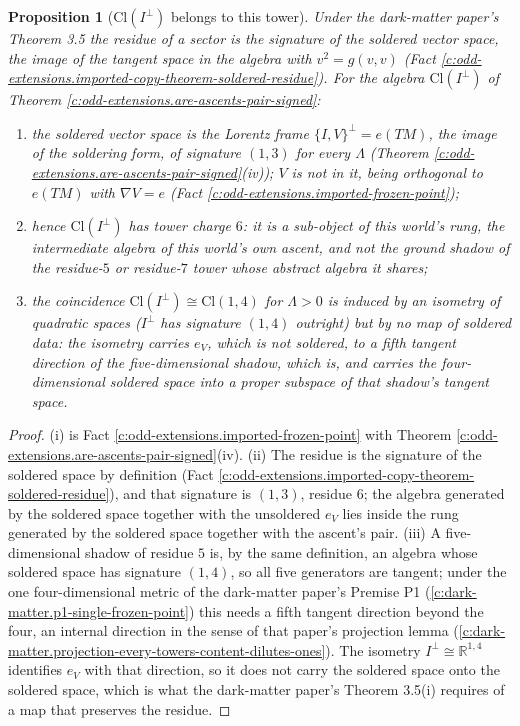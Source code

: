 \documentclass[11pt]{article}
\newtheorem{proposition}[theorem]{Proposition}
\theoremstyle{definition}
\theoremstyle{plain}
\providecommand{\Cl}{}\renewcommand{\Cl}{\mathrm{Cl}}
\providecommand{\R}{}\renewcommand{\R}{\mathbb{R}}
\begin{document}
\begin{proposition}[$\Cl(I^{\perp})$ belongs to this tower]\label{c:odd-extensions.belongs-tower}
Under the dark-matter paper's Theorem 3.5 the residue of a sector is the signature of the soldered vector space, the image of the tangent space in the algebra with $v^{2} = g(v,v)$ (Fact \ref{c:odd-extensions.imported-copy-theorem-soldered-residue}). For the algebra $\Cl(I^{\perp})$ of Theorem \ref{c:odd-extensions.are-ascents-pair-signed}:
\begin{enumerate}
\item[(i)] the soldered vector space is the Lorentz frame $\{I,V\}^{\perp} = e(TM)$, the image of the soldering form, of signature $(1,3)$ for every $\Lambda$ (Theorem \ref{c:odd-extensions.are-ascents-pair-signed}(iv)); $V$ is not in it, being orthogonal to $e(TM)$ with $\nabla V = e$ (Fact \ref{c:odd-extensions.imported-frozen-point});
\item[(ii)] hence $\Cl(I^{\perp})$ has tower charge $6$: it is a sub-object of this world's rung, the intermediate algebra of this world's own ascent, and not the ground shadow of the residue-$5$ or residue-$7$ tower whose abstract algebra it shares;
\item[(iii)] the coincidence $\Cl(I^{\perp}) \cong \Cl(1,4)$ for $\Lambda > 0$ is induced by an isometry of quadratic spaces ($I^{\perp}$ has signature $(1,4)$ outright) but by no map of soldered data: the isometry carries $e_{V}$, which is not soldered, to a fifth tangent direction of the five-dimensional shadow, which is, and carries the four-dimensional soldered space into a proper subspace of that shadow's tangent space.
\end{enumerate}
\end{proposition}
\begin{proof}
(i) is Fact \ref{c:odd-extensions.imported-frozen-point} with Theorem \ref{c:odd-extensions.are-ascents-pair-signed}(iv). (ii) The residue is the signature of the soldered space by definition (Fact \ref{c:odd-extensions.imported-copy-theorem-soldered-residue}), and that signature is $(1,3)$, residue $6$; the algebra generated by the soldered space together with the unsoldered $e_{V}$ lies inside the rung generated by the soldered space together with the ascent's pair. (iii) A five-dimensional shadow of residue $5$ is, by the same definition, an algebra whose soldered space has signature $(1,4)$, so all five generators are tangent; under the one four-dimensional metric of the dark-matter paper's Premise P1 (\ref{c:dark-matter.p1-single-frozen-point}) this needs a fifth tangent direction beyond the four, an internal direction in the sense of that paper's projection lemma \cite[Lem.~6.1]{ButlerT14} (\ref{c:dark-matter.projection-every-towers-content-dilutes-ones}). The isometry $I^{\perp} \cong \R^{1,4}$ identifies $e_{V}$ with that direction, so it does not carry the soldered space onto the soldered space, which is what the dark-matter paper's Theorem 3.5(i) requires of a map that preserves the residue.

\end{proof}
\end{document}
